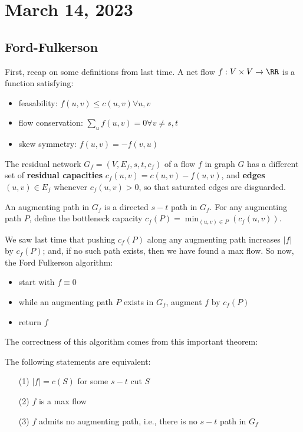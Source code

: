 \section{March 14, 2023}

\subsection{Ford-Fulkerson}

First, recap on some definitions from last time. A net flow $f:V\times V\rightarrow \RR$ is a function satisfying:
\begin{itemize}
    \item feasability: $f(u,v)\leq c(u,v)\forall u,v$
    \item flow conservation: $\sum_u f(u,v) = 0\forall v\neq s,t$
    \item skew symmetry: $f(u,v) = -f(v,u)$
\end{itemize}

The residual network $G_f = (V, E_f, s, t, c_f)$ of a flow $f$ in graph $G$ has a different set of \textbf{residual capacities} $c_f(u,v) = c(u,v) - f(u,v)$, and \textbf{edges} $(u,v)\in E_f$ whenever $c_f(u,v) > 0$, so that saturated edges are disguarded. 

\begin{definition}

An \ac{augmenting} path in $G_f$ is a directed $s-t$ path in $G_f$. For any augmenting path $P$, define the \ac{bottleneck capacity} $c_f(P) = \min_{(u,v)\in P}(c_f(u,v))$. 
\end{definition}

We saw last time that pushing $c_f(P)$ along any augmenting path increases $\vert f\vert$ by $c_f(P)$; and, if no such path exists, then we have found a max flow. So now, the \ac{Ford Fulkerson algorithm}:
\begin{itemize}
    \item start with $f\equiv 0$
    \item while an augmenting path $P$ exists in $G_f$, augment $f$ by $c_f(P)$
    \item return $f$
\end{itemize}

The correctness of this algorithm comes from this important theorem: 

\begin{theorem}

The following statements are equivalent:
\begin{enumerate}
    \item [(1)] $\vert f\vert = c(S)$ for some $s-t$ cut $S$
    \item [(2)] $f$ is a max flow 
    \item [(3)] $f$ admits no augmenting path, i.e., there is no $s-t$ path in $G_f$
\end{enumerate}
\end{theorem}

